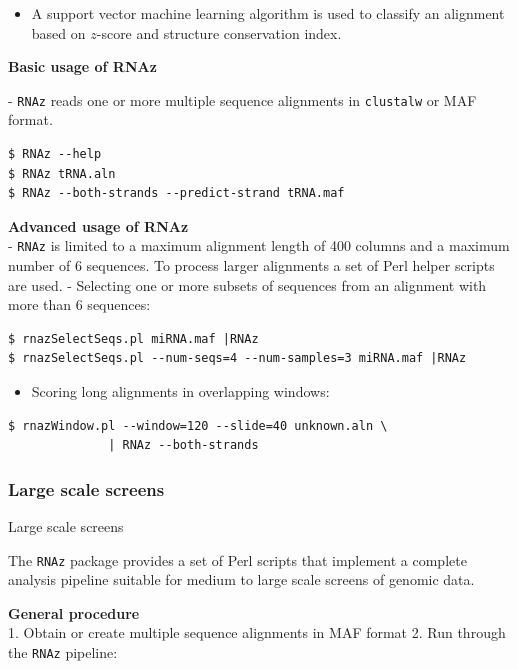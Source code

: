 \documentclass[]{article}
\providecommand{\tightlist}{%
  \setlength{\itemsep}{0pt}\setlength{\parskip}{0pt}}
\begin{document}
\begin{itemize}
\tightlist
\item
  A support vector machine learning algorithm is used to classify an
  alignment based on \(z\)-score and structure conservation index.
\end{itemize}

\textbf{Basic usage of RNAz}\\
  - \texttt{RNAz} reads one or more multiple sequence
alignments in \texttt{clustalw} or MAF format.

\begin{verbatim}
$ RNAz --help
$ RNAz tRNA.aln
$ RNAz --both-strands --predict-strand tRNA.maf
\end{verbatim}

\textbf{Advanced usage of RNAz}\\
- \texttt{RNAz} is limited to a maximum alignment length of 400 columns
and a maximum number of 6 sequences. To process larger alignments a set
of Perl helper scripts are used. - Selecting one or more subsets of
sequences from an alignment with more than 6 sequences:

\begin{verbatim}
$ rnazSelectSeqs.pl miRNA.maf |RNAz
$ rnazSelectSeqs.pl --num-seqs=4 --num-samples=3 miRNA.maf |RNAz
\end{verbatim}

\begin{itemize}
\tightlist
\item
  Scoring long alignments in overlapping windows:
\end{itemize}

\begin{verbatim}
$ rnazWindow.pl --window=120 --slide=40 unknown.aln \
              | RNAz --both-strands
\end{verbatim}

\subsubsection{Large scale screens}{Large scale screens}\label{large-scale-screens}

The \texttt{RNAz} package provides a set of Perl scripts that implement
a complete analysis pipeline suitable for medium to large scale screens
of genomic data.

\textbf{General procedure}\\
1. Obtain or create multiple sequence alignments in MAF format 2. Run
through the \texttt{RNAz} pipeline:
\end{document}
